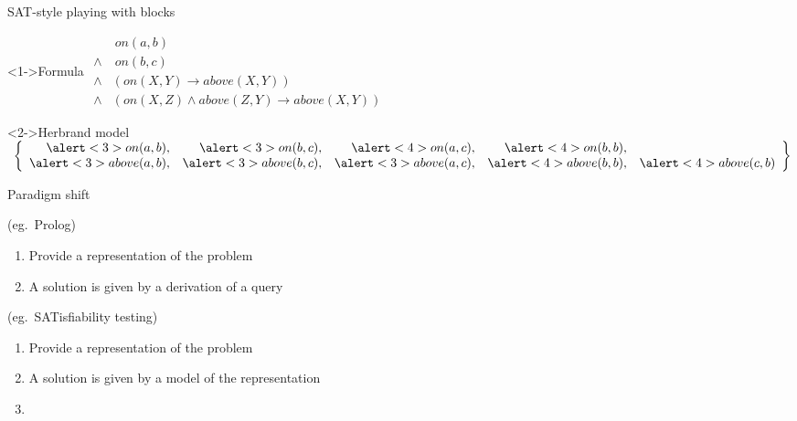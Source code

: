 \begin{frame}[fragile]{SAT-style playing with blocks}
  \begin{block}<1->{Formula}
    \small
    \medskip
    \(
    \begin{array}{rl}
           & \ on(a,b)
    \\
    \wedge & \ on(b,c)
    \\
    \wedge & \left( on(X,Y) \to above(X,Y)\right) \\
    \wedge & \left( on(X,Z) \wedge above(Z,Y) \to above(X,Y)\right)
    \end{array}
    \)
    \medskip
  \end{block}
  \begin{block}<2->{Herbrand model\phantom{g!)}}
    \small
    \medskip
    \(\
    \left\{
    \begin{array}{rrrrrr}
            \alert<3>{on(a,b)},&    \alert<3>{on(b,c)},&    \alert<4>{on(a,c)},&    \alert<4>{on(b,b)},&
      \\ \alert<3>{above(a,b)},& \alert<3>{above(b,c)},& \alert<3>{above(a,c)},& \alert<4>{above(b,b)},& \alert<4>{above(c,b)}
    \end{array}
    \right\}
    \)
    \medskip
\end{block}
\end{frame}
\begin{frame}{Paradigm shift}
  \bigskip

  \begin{description}

  \item<1>[Theorem Proving based approach] (eg.\ Prolog)
    \begin{enumerate}
    \item Provide a representation of the problem

    \item A solution is given by a \alert{derivation} of a query
    \end{enumerate}
    \bigskip

  \item[Model Generation based approach] (eg.\ SATisfiability testing)
    \begin{enumerate}
    \item Provide a representation of the problem

    \item A solution is given by a \alert{model} of the representation
      \bigskip
    \item []
    \end{enumerate}
  \end{description}
\end{frame}
